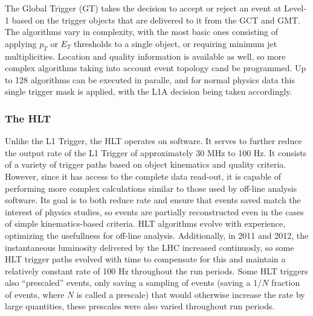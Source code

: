 The Global Trigger (GT) takes the decision to accept or reject an event at Level-1 based on the trigger objects that are delivered to it from the GCT and GMT.  The algorithms vary in complexity, with the most basic ones consisting of applying $p_T$ or $E_T$ thresholds to a single object, or requiring minimum jet multiplicities.  Location and quality information is available as well, so more complex algorithms taking into account event topology cand be programmed.  Up to 128 algorithms can be executed in paralle, and for normal physics data this single trigger mask is applied, with the L1A decision being taken accordingly.  



\subsubsection{The HLT}
\label{hlt}

Unlike the L1 Trigger, the HLT operates on software.  It serves to further reduce the output rate of the L1 Trigger of approximately 30 MHz to 100 Hz.  It consists of a variety of trigger paths based on object kinematics and quality criteria.  However, since it has access to the complete data read-out, it is capable of performing more complex calculations similar to those used by off-line analysis software.  Its goal is to both reduce rate and ensure that events saved match the interest of physics studies, so events are partially reconstructed even in the cases of simple kinematics-based criteria.  HLT algorithms evolve with experience, optimizing the usefullness for off-line analysis.  Additionally, in 2011 and 2012, the instantaneous luminosity delivered by the LHC increased continuosly, so some HLT trigger paths evolved with time to compensate for this and maintain a relatively constant rate of 100 Hz throughout the run periods.  Some HLT triggers also ``prescaled'' events, only saving a sampling of events (saving a $1/N$ fraction of events, where $N$ is called a prescale) that would otherwise increase the rate by large quantities, these prescales were also varied throughout run periods.
